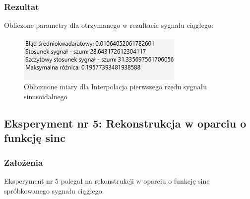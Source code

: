 \documentclass[12pt]{article}
\begin{document}
\subsubsection{Rezultat}
Obliczone parametry dla otrzymanego w rezultacie sygnału ciągłego:
\begin{figure}[H]
	\centering
	\includegraphics[width=\linewidth]{wyniki_interpolacja_pierwszy.jpg}
	\caption{Oblicznone miary dla Interpolacja pierwszego rzędu sygnału sinusoidalnego}
	\label{wartości dla eksperymentu 4}
\end{figure}


\newpage
\subsection{Eksperyment nr 5: Rekonstrukcja w oparciu o funkcję sinc }
\subsubsection{Założenia}
Eksperyment nr 5 polegał na rekonstrukcji w oparciu o funkcję sinc spróbkowanego sygnału ciągłego.
\end{document}
